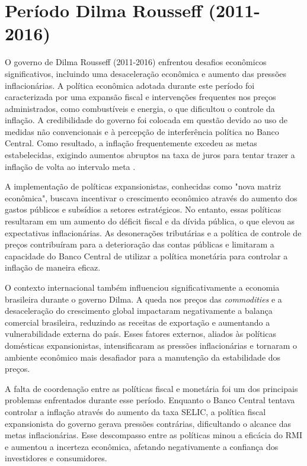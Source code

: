 \documentclass[12pt,oneside,a4paper,chapter=TITLE,english,brazil,sumario=abnt-6027-2012]{abntex2}
\begin{document}
\section{Período Dilma Rousseff (2011-2016)}
O governo de Dilma Rousseff (2011-2016) enfrentou desafios econômicos significativos, incluindo uma desaceleração econômica e aumento das pressões inflacionárias. A política econômica adotada durante este período foi caracterizada por uma expansão fiscal e intervenções frequentes nos preços administrados, como combustíveis e energia, o que dificultou o controle da inflação. A credibilidade do governo foi colocada em questão devido ao uso de medidas não convencionais e à percepção de interferência política no Banco Central. Como resultado, a inflação frequentemente excedeu as metas estabelecidas, exigindo aumentos abruptos na taxa de juros para tentar trazer a inflação de volta ao intervalo meta \cite{carvalho_2016_growth}.

A implementação de políticas expansionistas, conhecidas como "nova matriz econômica", buscava incentivar o crescimento econômico através do aumento dos gastos públicos e subsídios a setores estratégicos. No entanto, essas políticas resultaram em um aumento do déficit fiscal e da dívida pública, o que elevou as expectativas inflacionárias. As desonerações tributárias e a política de controle de preços contribuíram para a deterioração das contas públicas e limitaram a capacidade do Banco Central de utilizar a política monetária para controlar a inflação de maneira eficaz.

O contexto internacional também influenciou significativamente a economia brasileira durante o governo Dilma. A queda nos preços das \textit{commodities} e a desaceleração do crescimento global impactaram negativamente a balança comercial brasileira, reduzindo as receitas de exportação e aumentando a vulnerabilidade externa do país. Esses fatores externos, aliados às políticas domésticas expansionistas, intensificaram as pressões inflacionárias e tornaram o ambiente econômico mais desafiador para a manutenção da estabilidade dos preços.

A falta de coordenação entre as políticas fiscal e monetária foi um dos principais problemas enfrentados durante esse período. Enquanto o Banco Central tentava controlar a inflação através do aumento da taxa SELIC, a política fiscal expansionista do governo gerava pressões contrárias, dificultando o alcance das metas inflacionárias. Esse descompasso entre as políticas minou a eficácia do RMI e aumentou a incerteza econômica, afetando negativamente a confiança dos investidores e consumidores.
\end{document}
